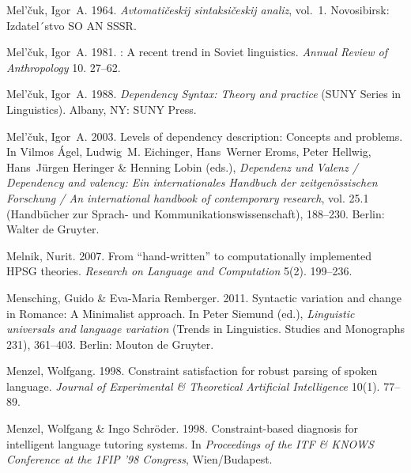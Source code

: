 \begin{thebibliography}{1420}
Mel'{\v c}uk, Igor~A. 1964.
\newblock \emph{Avtomati{\v c}eskij sintaksi{\v c}eskij analiz}, vol.~1.
\newblock Novosibirsk: Izdatel´stvo SO AN SSSR.

Mel'{\v c}uk, Igor~A. 1981.
: {A} recent trend in {Soviet} linguistics.
\newblock \emph{Annual Review of Anthropology} 10. 27--62.

Mel'{\v c}uk, Igor~A. 1988.
\newblock \emph{{Dependency Syntax}: {Theory} and practice}  (SUNY Series in
  Linguistics).
\newblock Albany, NY: SUNY Press.

Mel'{\v c}uk, Igor~A. 2003.
\newblock Levels of dependency description: {Concepts} and problems.
\newblock In Vilmos {\'A}gel, Ludwig~M. Eichinger, Hans~Werner Eroms, Peter
  Hellwig, Hans~J{\"u}rgen Heringer \& Henning Lobin (eds.), \emph{{Dependenz
  und Valenz} / {Dependency} and valency: {Ein internationales Handbuch der
  zeitgen{\"o}ssischen Forschung} / {An} international handbook of contemporary
  research}, vol. 25.1  (Hand\-b{\"u}\-cher zur Sprach- und
  Kommunikationswissenschaft), 188--230. Berlin: Walter de Gruyter.

Melnik, Nurit. 2007.
\newblock From ``hand-written'' to computationally implemented {HPSG} theories.
\newblock \emph{Research on Language and Computation} 5(2). 199--236.

Mensching, Guido \& Eva-Maria Remberger. 2011.
\newblock Syntactic variation and change in {Romance}: {A} {Minimalist}
  approach.
\newblock In Peter Siemund (ed.), \emph{Linguistic universals and language
  variation} (Trends in Linguistics. Studies and Monographs 231), 361--403.
  Berlin: Mouton de Gruyter.

Menzel, Wolfgang. 1998.
\newblock Constraint satisfaction for robust parsing of spoken language.
\newblock \emph{Journal of Experimental \& Theoretical Artificial Intelligence}
  10(1). 77--89.

Menzel, Wolfgang \& Ingo Schr{\"o}der. 1998{}.
\newblock Constraint-based diagnosis for intelligent language tutoring systems.
\newblock In \emph{Proceedings of the {ITF \& KNOWS Conference at the 1FIP '98
  Congress}}, Wien/Budapest.


\end{thebibliography}
